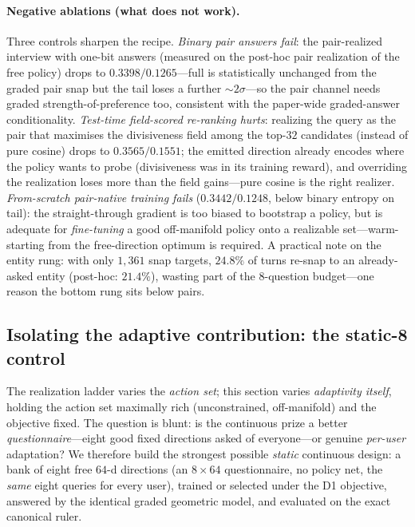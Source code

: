 \documentclass[11pt]{article}
\begin{document}
\paragraph{Negative ablations (what does not work).} Three controls sharpen the recipe. \emph{Binary pair answers
fail}: the pair-realized interview with one-bit answers (measured on the post-hoc pair realization of the free policy)
drops to $0.3398/0.1265$---full is statistically unchanged from the graded pair snap but the tail loses a further
${\sim}2\sigma$---so the pair channel needs graded strength-of-preference too, consistent with the paper-wide
graded-answer conditionality. \emph{Test-time field-scored
re-ranking hurts}: realizing the query as the pair that maximises the divisiveness field among the top-$32$ candidates
(instead of pure cosine) drops to $0.3565/0.1551$; the emitted direction already encodes where the policy wants to
probe (divisiveness was in its training reward), and overriding the realization loses more than the field gains---pure
cosine is the right realizer. \emph{From-scratch pair-native training fails} ($0.3442/0.1248$, below binary entropy on
tail): the straight-through gradient is too biased to bootstrap a policy, but is adequate for \emph{fine-tuning} a good
off-manifold policy onto a realizable set---warm-starting from the free-direction optimum is required. A practical note
on the entity rung: with only $1{,}361$ snap targets, $24.8\%$ of turns re-snap to an already-asked entity (post-hoc:
$21.4\%$), wasting part of the $8$-question budget---one reason the bottom rung sits below pairs.

\subsection{Isolating the adaptive contribution: the static-8 control}\label{sec:static8}
The realization ladder varies the \emph{action set}; this section varies \emph{adaptivity itself}, holding the action
set maximally rich (unconstrained, off-manifold) and the objective fixed. The question is blunt: is the continuous prize
a better \emph{questionnaire}---eight good fixed directions asked of everyone---or genuine \emph{per-user} adaptation? We
therefore build the strongest possible \emph{static} continuous design: a bank of eight free $64$-d directions (an
$8\times64$ questionnaire, no policy net, the \emph{same} eight queries for every user), trained or selected under the
D1 objective, answered by the identical graded geometric model, and evaluated on the exact canonical ruler.
\end{document}

